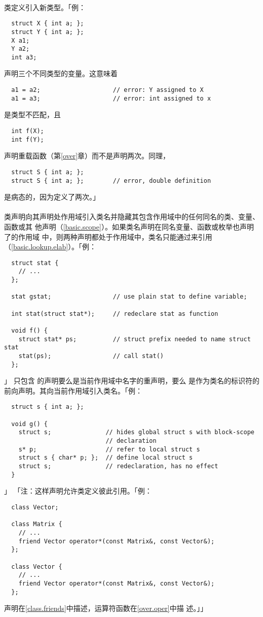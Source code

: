 \paragraph{}
类定义引入新类型。「例：
\begin{lstlisting}
  struct X { int a; };
  struct Y { int a; };
  X a1;
  Y a2;
  int a3;
\end{lstlisting}
声明三个不同类型的变量。这意味着
\begin{lstlisting}
  a1 = a2;                    // error: Y assigned to X
  a1 = a3;                    // error: int assigned to x
\end{lstlisting}
是类型不匹配，且
\begin{lstlisting}
  int f(X);
  int f(Y);
\end{lstlisting}
声明重载函数（第\ref{over}章）而不是声明两次。同理，
\begin{lstlisting}
  struct S { int a; };
  struct S { int a; };        // error, double definition
\end{lstlisting}
是病态的，因为定义了两次。」

\paragraph{}
类声明向其声明处作用域引入类名并隐藏其包含作用域中的任何同名的类、变量、函数或其
他声明（\ref{basic.scope}）。如果类名声明在同名变量、函数或枚举也声明了的作用域
中，则两种声明都处于作用域中，类名只能通过来引用
（\ref{basic.lookup.elab}）。「例：
\begin{lstlisting}
  struct stat {
    // ...
  };

  stat gstat;                 // use plain stat to define variable;

  int stat(struct stat*);     // redeclare stat as function

  void f() {
    struct stat* ps;          // struct prefix needed to name struct stat
    stat(ps);                 // call stat()
  };
\end{lstlisting}」
只包含 \tm{;}的声明要么是当前作用域中名字的重声明，要么
是作为类名的标识符的前向声明。其向当前作用域引入类名。「例：
\begin{lstlisting}
  struct s { int a; };

  void g() {
    struct s;               // hides global struct s with block-scope
                            // declaration
    s* p;                   // refer to local struct s
    struct s { char* p; };  // define local struct s
    struct s;               // redeclaration, has no effect
  }
\end{lstlisting}」
「注：这样声明允许类定义彼此引用。「例：
\begin{lstlisting}
  class Vector;

  class Matrix {
    // ...
    friend Vector operator*(const Matrix&, const Vector&);
  };

  class Vector {
    // ...
    friend Vector operator*(const Matrix&, const Vector&);
  };
\end{lstlisting}
声明在\ref{class.friends}中描述，运算符函数在\ref{over.oper}中描
述。」」

